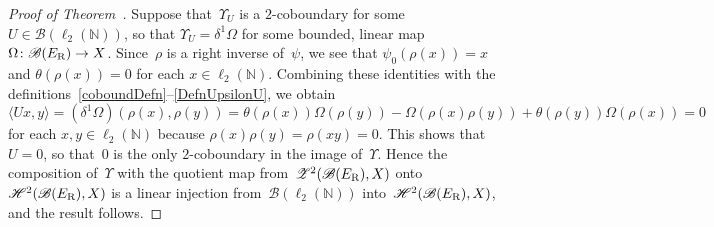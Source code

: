 \documentclass[11pt,reqno]{amsart}
\theoremstyle{definition}
\numberwithin{equation}{section}
\newcommand{\N}{\mathbb{N}}
\begin{document}
\begin{proof}[Proof of Theorem~{\normalfont{\ref{mainthmH2BER}}}]
Suppose that~$\Upsilon_U$ is a $2$-coboundary for some
$U\in\mathscr{B}(\ell_2(\N))$, so that $\Upsilon_U = \delta^1\Omega$
for some bounded, linear map
$\Omega\colon\mathscr{B}(E_{\text{\normalfont{R}}})\to X$. 
Since~$\rho$ is a right inverse of~$\psi$, we see
that $\psi_0(\rho(x)) = x$ and $\theta(\rho(x)) = 0$ for each $x\in\ell_2(\N)$. 
Combining these identities with the
definitions~\eqref{coboundDefn}--\eqref{DefnUpsilonU}, we obtain
\[ \langle Ux, y\rangle = 
(\delta^1\Omega)(\rho(x),\rho(y)) = \theta(\rho(x))\Omega(\rho(y)) -
\Omega(\rho(x)\rho(y)) + \theta(\rho(y))\Omega(\rho(x)) = 0 \] for
each $x,y\in\ell_2(\N)$ because $\rho(x)\rho(y) = \rho(xy) = 0$. This
shows that $ U= 0$, so that~$0$ is the only $2$-coboundary in the
image of~$\Upsilon$.  Hence the composition of~$\Upsilon$ with the
quotient map
from~$\mathscr{Z}^2(\mathscr{B}(E_{\text{\normalfont{R}}}),X)$
onto~$\mathscr{H}^2(\mathscr{B}(E_{\text{\normalfont{R}}}),X)$ is a
linear injection from~$\mathscr{B}(\ell_2(\N))$
into~$\mathscr{H}^2(\mathscr{B}(E_{\text{\normalfont{R}}}),X)$, and
the result follows.
\end{proof} 
\end{document}
